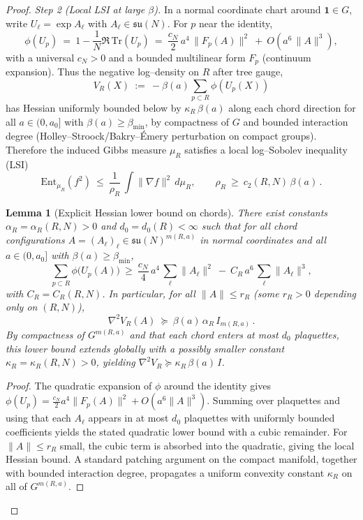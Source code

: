 \documentclass[11pt]{amsart}
\theoremstyle{plain}
\newtheorem{lemma}[theorem]{Lemma}
\theoremstyle{definition}
\theoremstyle{remark}
\renewcommand{\tfrac}[2]{\textstyle\frac{#1}{#2}}
\begin{document}
\begin{proof}
\emph{Step 2 (Local LSI at large $\beta$).} In a normal coordinate chart around $\mathbf{1}\in G$, write $U_\ell=\exp A_\ell$ with $A_\ell\in\mathfrak{su}(N)$. For $p$ near the identity,
\[
  \phi(U_p)\ =\ 1-\tfrac{1}{N}\Re\,\mathrm{Tr}(U_p)
  \ =\ \tfrac{c_N}{2}\,a^4\,\|F_p(A)\|^2\ +\ O(a^6\,\|A\|^3),
\]
with a universal $c_N>0$ and a bounded multilinear form $F_p$ (continuum expansion). Thus the negative log--density on $R$ after tree gauge,
\[
  V_R(X)\ :=\ -\beta(a)\sum_{p\subset R}\phi(U_p(X))
\]
has Hessian uniformly bounded below by $\kappa_R\,\beta(a)$ along each chord direction for all $a\in(0,a_0]$ with $\beta(a)\ge \beta_{\min}$, by compactness of $G$ and bounded interaction degree (Holley--Stroock/Bakry--\'Emery perturbation on compact groups). Therefore the induced Gibbs measure $\mu_R$ satisfies a local log--Sobolev inequality (LSI)
\[
  \mathrm{Ent}_{\mu_R}(f^2)\ \le\ \frac{1}{\rho_R}\,\int \|\nabla f\|^2\,d\mu_R,
  \qquad \rho_R\ \ge\ c_2(R,N)\,\beta(a)\,.
\]
\begin{lemma}[Explicit Hessian lower bound on chords]\label{lem:hessian-lower-chords}
There exist constants $\alpha_R=\alpha_R(R,N)>0$ and $d_0=d_0(R)<\infty$ such that for all chord configurations $A=(A_\ell)_\ell\in\mathfrak{su}(N)^{m(R,a)}$ in normal coordinates and all $a\in(0,a_0]$ with $\beta(a)\ge\beta_{\min}$,
\[
  \sum_{p\subset R} \phi\big(U_p(A)\big)\ \ge\ \tfrac{c_N}{4}\,a^4\,\sum_{\ell}\|A_\ell\|^2\ -\ C_R\,a^6\,\sum_{\ell}\|A_\ell\|^3,
\]
with $C_R=C_R(R,N)$. In particular, for all $\|A\|\le r_R$ (some $r_R>0$ depending only on $(R,N)$),
\[
  \nabla^2 V_R(A)\ \succeq\ \beta(a)\,\alpha_R\, I_{m(R,a)}\,.
\]
By compactness of $G^{m(R,a)}$ and that each chord enters at most $d_0$ plaquettes, this lower bound extends globally with a possibly smaller constant $\kappa_R=\kappa_R(R,N)>0$, yielding $\nabla^2 V_R\succeq \kappa_R\,\beta(a)\,I$.
\end{lemma}
\begin{proof}
The quadratic expansion of $\phi$ around the identity gives $\phi(U_p)= \tfrac{c_N}{2} a^4\|F_p(A)\|^2+O(a^6\|A\|^3)$. Summing over plaquettes and using that each $A_\ell$ appears in at most $d_0$ plaquettes with uniformly bounded coefficients yields the stated quadratic lower bound with a cubic remainder. For $\|A\|\le r_R$ small, the cubic term is absorbed into the quadratic, giving the local Hessian bound. A standard patching argument on the compact manifold, together with bounded interaction degree, propagates a uniform convexity constant $\kappa_R$ on all of $G^{m(R,a)}$.
\end{proof}


\end{proof}
\end{document}
